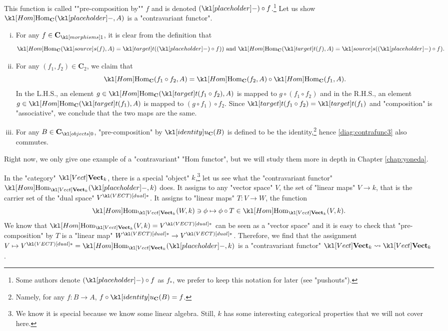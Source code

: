 \documentclass[main.tex]{subfiles}
\begin{document}
\begin{exmp}
\begin{enumerate}
		\AP This function is called ""pre-composition by"" $f$ and is denoted $(\placeholder) \circ f$.\footnote{Some authors denote $(\placeholder) \circ f$ as $f_*$, we prefer to keep this notation for later (see "pushouts").} Let us show $\Hom_{\mathbf{C}}(\placeholder,A)$ is a "contravariant functor".
		\begin{enumerate}[i.]
			\item For any $f \in \mor{\mathbf{C}}$, it is clear from the definition that \[\Hom_{\mathbf{C}}(\source(f),A) = \target((\placeholder) \circ f))\text{ and } \Hom_{\mathbf{C}}(\target(f),A) = \source((\placeholder) \circ f).\]
			\item For any $(f_1,f_2) \in \mathbf{C}_2$, we claim that \[\Hom_{\mathbf{C}}(f_1\circ f_2,A) = \Hom_{\mathbf{C}}(f_2,A)\circ \Hom_{\mathbf{C}}(f_1,A).\] In the L.H.S., an element $g \in \Hom_{\mathbf{C}}(\target(f_1\circ f_2),A)$ is mapped to $g\circ (f_1 \circ f_2)$ and in the R.H.S., an element $g \in \Hom_{\mathbf{C}}(\target(f_1),A)$ is mapped to $(g\circ f_1) \circ f_2$. Since $\target(f_1 \circ f_2) = \target(f_1)$ and "composition" is "associative", we conclude that the two maps are the same.
			\item For any $B \in \obj{\mathbf{C}}$, "pre-composition" by $\idu_{\mathbf{C}}(B)$ is defined to be the identity,\footnote{Namely, for any $f: B \rightarrow A$, $f \circ \idu_{\mathbf{C}}(B) = f$.} hence \eqref{diag:contrafunc3} also commutes.
		\end{enumerate}
	\end{enumerate}
\end{exmp}
Right now, we only give one example of a "contravariant" "Hom functor", but we will study them more in depth in Chapter \ref{chap:yoneda}.
\begin{exmp}
	In the "category" $\catVect{k}$, there is a special "object" $k$,\footnote{We know it is special because we know some linear algebra. Still, $k$ has some interesting categorical properties that we will not cover here.} let us see what the "contravariant functor" $\Hom_{\catVect{k}}(\placeholder, k)$ does. It assigns to any "vector space" $V$, the set of "linear maps" $V \rightarrow k$, that is the carrier set of the "dual space" $\dual{V}$. It assigns to "linear maps" $T: V \rightarrow W$, the function \[\Hom_{\catVect{k}}(W,k) \ni \phi \mapsto \phi \circ T \in \Hom_{\catVect{k}}(V,k).\]
	We know that $\Hom_{\catVect{k}}(V,k) = \dual{V}$ can be seen as a "vector space" and it is easy to check that "pre-composition" by $T$ is a "linear map" $\dual{W} \rightarrow \dual{V}$. Therefore, we find that the assignment $V \mapsto \dual{V} = \Hom_{\catVect{k}}(\placeholder,k)$ is a "contravariant functor" $\catVect{k} \rightsquigarrow \catVect{k}$.
\end{exmp}
\end{document}
